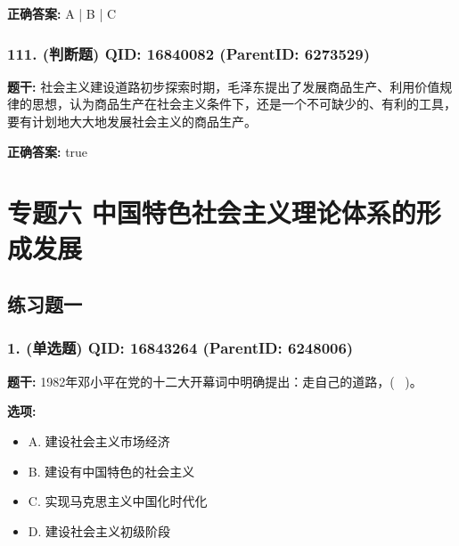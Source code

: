 \documentclass[12pt,UTF8]{ctexart}
\begin{document}
\textbf{正确答案:}
A | B | C

\vspace{0.3em}\hrulefill\vspace{0.7em}

\subsubsection*{111. (判断题) \small QID: 16840082 (ParentID: 6273529)}

\textbf{题干:}
社会主义建设道路初步探索时期，毛泽东提出了发展商品生产、利用价值规律的思想，认为商品生产在社会主义条件下，还是一个不可缺少的、有利的工具，要有计划地大大地发展社会主义的商品生产。



\textbf{正确答案:}
true

\vspace{0.3em}\hrulefill\vspace{0.7em}

\section*{专题六 中国特色社会主义理论体系的形成发展}
\hrulefill

\subsection*{练习题一}

\subsubsection*{1. (单选题) \small QID: 16843264 (ParentID: 6248006)}

\textbf{题干:}
1982年邓小平在党的十二大开幕词中明确提出：走自己的道路，(  )。



\textbf{选项:}
\begin{itemize}[leftmargin=*]

  \item A. 建设社会主义市场经济

  \item B. 建设有中国特色的社会主义

  \item C. 实现马克思主义中国化时代化

  \item D. 建设社会主义初级阶段

\end{itemize}
\end{document}
